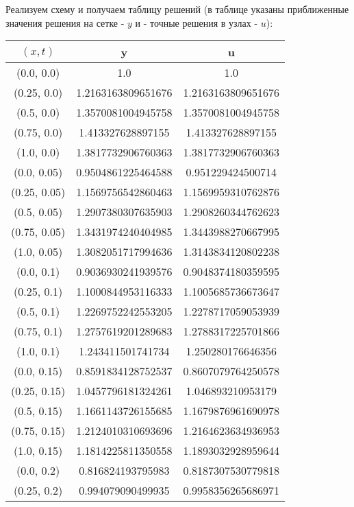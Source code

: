 Реализуем схему и получаем таблицу решений (в таблице указаны приближенные значения решения на сетке - $y$ и - точные решения в узлах - $u$):
\tiny
\begin{table}[H]
\begin{tabular}{|c|c|c|}
\hline
$(x,t)$ &  y & u \\
\hline
(0.0, 0.0) & 1.0 & 1.0 \\
\hline
(0.25, 0.0) & 1.2163163809651676 & 1.2163163809651676 \\
\hline
(0.5, 0.0) & 1.3570081004945758 & 1.3570081004945758 \\
\hline
(0.75, 0.0) & 1.413327628897155 & 1.413327628897155 \\
\hline
(1.0, 0.0) & 1.3817732906760363 & 1.3817732906760363 \\
\hline
\hline
(0.0, 0.05) & 0.9504861225464588 & 0.951229424500714 \\
\hline
(0.25, 0.05) & 1.1569756542860463 & 1.1569959310762876 \\
\hline
(0.5, 0.05) & 1.2907380307635903 & 1.2908260344762623 \\
\hline
(0.75, 0.05) & 1.3431974240404985 & 1.3443988270667995 \\
\hline
(1.0, 0.05) & 1.3082051717994636 & 1.3143834120802238 \\
\hline
\hline
(0.0, 0.1) & 0.9036930241939576 & 0.9048374180359595 \\
\hline
(0.25, 0.1) & 1.1000844953116333 & 1.1005685736673647 \\
\hline
(0.5, 0.1) & 1.2269752242553205 & 1.2278717059053939 \\
\hline
(0.75, 0.1) & 1.2757619201289683 & 1.2788317225701866 \\
\hline
(1.0, 0.1) & 1.243411501741734 & 1.250280176646356 \\
\hline
\hline
(0.0, 0.15) & 0.8591834128752537 & 0.8607079764250578 \\
\hline
(0.25, 0.15) & 1.0457796181324261 & 1.046893210953179 \\
\hline
(0.5, 0.15) & 1.1661143726155685 & 1.1679876961690978 \\
\hline
(0.75, 0.15) & 1.2124010310693696 & 1.2164623634936953 \\
\hline
(1.0, 0.15) & 1.1814225811350558 & 1.1893032928959644 \\
\hline
\hline
(0.0, 0.2) & 0.816824193795983 & 0.8187307530779818 \\
\hline
(0.25, 0.2) & 0.994079090499935 & 0.9958356265686971 \\

\end{tabular}
\end{table}

